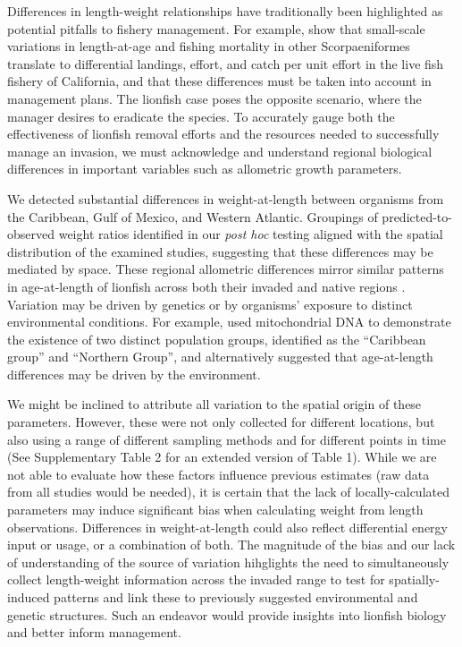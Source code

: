 \documentclass[fleqn,10pt,lineno]{wlpeerj} %
\begin{document}
Differences in length-weight relationships have traditionally been
highlighted as potential pitfalls to fishery management. For example,
\citet{wilson_2012} show that small-scale variations in length-at-age
and fishing mortality in other Scorpaeniformes translate to differential
landings, effort, and catch per unit effort in the live fish fishery of
California, and that these differences must be taken into account in
management plans. The lionfish case poses the opposite scenario, where
the manager desires to eradicate the species. To accurately gauge both
the effectiveness of lionfish removal efforts and the resources needed
to successfully manage an invasion, we must acknowledge and understand
regional biological differences in important variables such as
allometric growth parameters.

We detected substantial differences in weight-at-length between
organisms from the Caribbean, Gulf of Mexico, and Western Atlantic.
Groupings of predicted-to-observed weight ratios identified in our
\emph{post hoc} testing aligned with the spatial distribution of the
examined studies, suggesting that these differences may be mediated by
space. These regional allometric differences mirror similar patterns in
age-at-length of lionfish across both their invaded and native regions
\citep{pusack_2016}. Variation may be driven by genetics or by
organisms' exposure to distinct environmental conditions. For example,
\citet{betancurr_2011} used mitochondrial DNA to demonstrate the
existence of two distinct population groups, identified as the
``Caribbean group'' and ``Northern Group'', and \citet{fogg_2015}
alternatively suggested that age-at-length differences may be driven by
the environment.

We might be inclined to attribute all variation to the spatial origin of
these parameters. However, these were not only collected for different
locations, but also using a range of different sampling methods and for
different points in time (See Supplementary Table 2 for an extended
version of Table 1). While we are not able to evaluate how these factors
influence previous estimates (raw data from all studies would be
needed), it is certain that the lack of locally-calculated parameters
may induce significant bias when calculating weight from length
observations. Differences in weight-at-length could also reflect
differential energy input or usage, or a combination of both. The
magnitude of the bias and our lack of understanding of the source of
variation hihglights the need to simultaneously collect length-weight
information across the invaded range to test for spatially-induced
patterns and link these to previously suggested environmental and
genetic structures. Such an endeavor would provide insights into
lionfish biology and better inform management.
\end{document}
